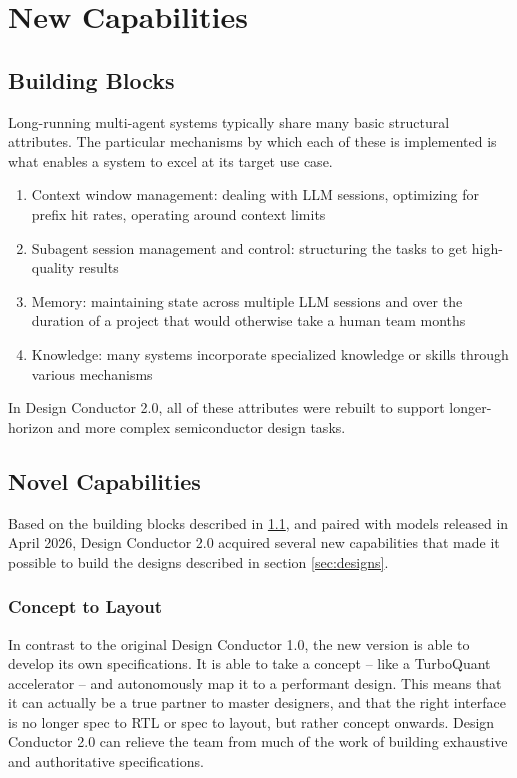 \section{New Capabilities}
\label{sec:capabilities}

\subsection{Building Blocks}
\label{subsec:blocks}

Long-running multi-agent systems typically share many basic structural attributes. The particular mechanisms by which each of these is implemented is what enables a system to excel at its target use case.
\begin{enumerate}
	\item Context window management: dealing with LLM sessions, optimizing for prefix hit rates, operating around context limits
	\item Subagent session management and control: structuring the tasks to get high-quality results
	\item Memory: maintaining state across multiple LLM sessions and over the duration of a project that would otherwise take a human team months
	\item Knowledge: many systems incorporate specialized knowledge or skills through various mechanisms
\end{enumerate}

In Design Conductor 2.0, all of these attributes were rebuilt to support longer-horizon and more complex semiconductor design tasks. 

\subsection{Novel Capabilities}

Based on the building blocks described in \ref{subsec:blocks}, and paired with models released in April 2026, Design Conductor 2.0 acquired several new capabilities that made it possible to build the designs described in section \ref{sec:designs}.

\subsubsection{Concept to Layout}

In contrast to the original Design Conductor 1.0, the new version is able to develop its own specifications. It is able to take a concept -- like a TurboQuant accelerator -- and autonomously map it to a performant design. This means that it can actually be a true partner to master designers, and that the right interface is no longer spec to RTL or spec to layout, but rather concept onwards. Design Conductor 2.0 can relieve the team from much of the work of building exhaustive and authoritative specifications.

